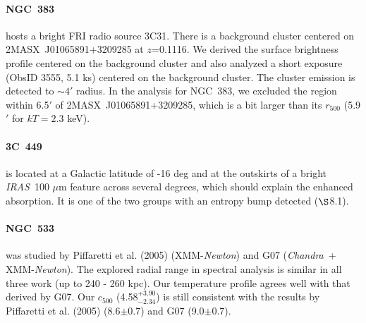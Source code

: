 \documentclass{aastex}
\def\chandra    {{\em Chandra}\/}
\def\xmm        {XMM-{\em Newton}\/}
\def\iras        {{\em IRAS}\/}
\begin{document}
\begin{appendix}
\paragraph{NGC~383} hosts a bright FRI radio source 3C31.
There is a background cluster centered on 2MASX~J01065891+3209285 at
$z$=0.1116. We derived the surface brightness profile centered on the
background cluster and also analyzed a short exposure (ObsID 3555, 5.1 ks) 
centered on the background cluster. The cluster emission is detected to
$\sim 4'$ radius. In the analysis for NGC~383, we
excluded the region within 6.5$'$ of 2MASX~J01065891+3209285, which is a bit
larger than its $r_{500}$ (5.9$'$ for $kT=2.3$ keV).

\paragraph{3C~449} is located at a Galactic latitude of -16 deg and at the
outskirts of a bright \iras\ 100 $\mu$m feature across several degrees,
which should explain the enhanced absorption.
It is one of the two groups with an entropy bump detected ($\S$8.1).

\paragraph{NGC~533} was studied by Piffaretti et al. (2005) (\xmm) and G07
(\chandra\ + \xmm). The explored radial range in spectral analysis is
similar in all three work (up to 240 - 260 kpc).
Our temperature profile agrees well with that derived by G07. Our $c_{500}$
(4.58$^{+3.90}_{-2.34}$) is still consistent with the results by Piffaretti
et al. (2005) (8.6$\pm$0.7) and G07 (9.0$\pm$0.7).


\end{appendix}
\end{document}
